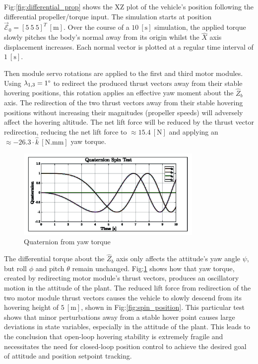 \par
Fig:\ref{fig:differential_prop} shows the XZ plot of the vehicle's position following the differential propeller/torque input. The simulation starts at position $\vec{\mathcal{E}}_0=[5~5~5]^T~[\text{m}]$. Over the course of a $10~[\text{s}]$ simulation, the applied torque slowly pitches the body's normal away from its origin whilst the $\hat{X}$ axis displacement increases. Each normal vector is plotted at a regular time interval of $1~[\text{s}]$. 
\par
Then module servo rotations are applied to the first and third motor modules. Using $\lambda_{1,3}=1\text{\textdegree}$ to redirect the produced thrust vectors away from their stable hovering positions, this rotation applies an effective yaw moment about the $\hat{Z}_b$ axis. The redirection of the two thrust vectors away from their stable hovering positions without increasing their magnitudes (propeller speeds) will adversely affect the hovering altitude. The net lift force will be reduced by the thrust vector redirection, reducing the net lift force to $\approx 15.4~[\text{N}]$ and applying an $\approx-26.3\cdot\hat{k}~[\text{N.mm}]$ yaw torque.
\begin{figure}[hbtp]
\vspace{-8pt}
\centering
\includegraphics[width=0.8\textwidth]{graphs/spin_quaternion}
\vspace{-6pt}
\caption{Quaternion from yaw torque}
\vspace{-10pt}
\label{fig:spin}
\end{figure}
\par
The differential torque about the $\hat{Z}_b$ axis only affects the attitude's yaw angle $\psi$, but roll $\phi$ and pitch $\theta$ remain unchanged. Fig:\ref{fig:spin} shows how that yaw torque, created by redirecting motor module's thrust vectors, produces an oscillatory motion in the attitude of the plant. The reduced lift force from redirection of the two motor module thrust vectors causes the vehicle to slowly descend from its hovering height of $5~[\text{m}]$, shown in Fig:\ref{fig:spin_position}. This particular test shows that minor perturbations away from a stable hover point causes large deviations in state variables, especially in the attitude of the plant. This leads to the conclusion that open-loop hovering stability is extremely fragile and necessitates the need for closed-loop position control to achieve the desired goal of attitude and position setpoint tracking.
